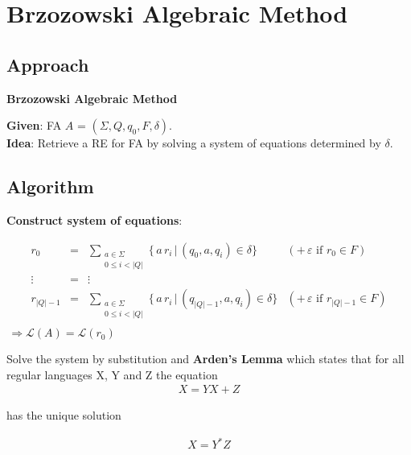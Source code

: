 \documentclass{beamer}
\begin{document}
\section{Brzozowski Algebraic Method}
\subsection*{Approach}
\begin{frame}
    \textbf{Brzozowski Algebraic Method}

    \textbf{Given}: FA $A$ = $(\Sigma, Q, q_0, F, \delta)$.\\
    \textbf{Idea}: Retrieve a RE for FA by solving a system of equations determined by $\delta$.

\end{frame}

\subsection*{Algorithm}
\begin{frame}
    \textbf{Construct system of equations}:

    \begin{equation*}
        \begin{array}{lcll} 
            r_0 & = & 
            \displaystyle\sum\limits_{
                \substack{a \in \Sigma \\ 0 \leq i < |Q|} 
            }
            \{ \, a \, r_i \, |  \, (q_0, a, q_i) \in \delta \} 
            &
            (+ \, \varepsilon \mbox{ if } r_0 \in F)
            \\ 
            \vdots &  = & \vdots \\
         r_{|Q|-1} & = & 
            \displaystyle\sum\limits_{
                \substack{a \in \Sigma \\ 0 \leq i < |Q|} 
            }
            \{ \, a \, r_i \, |  \, (q_{|Q|-1}, a, q_i) \in \delta \} 
            &
            (+ \, \varepsilon \mbox{ if } r_{|Q|-1} \in F)
            \\ 
        \end{array}
    \end{equation*}
    $\, \Rightarrow \mathcal{L}(A) = \mathcal{L}(r_0)$
\end{frame}

\begin{frame}
    Solve the system by substitution and \textbf{Arden's Lemma} which states that for all regular languages X, Y and Z the equation
    \begin{equation}
        \begin{array}{lcl}
            X = YX + Z
        \end{array}
    \end{equation}

    has the unique solution

    \begin{equation}
        \begin{array}{lcl}
            X = Y^*Z
        \end{array}
    \end{equation}
\end{frame}
\end{document}
